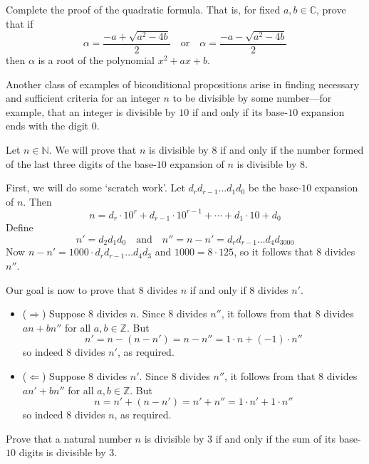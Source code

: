 \begin{exercise}
\label{exQuadraticFormulaConverse}
Complete the proof of the quadratic formula. That is, for fixed $a,b \in \mathbb{C}$, prove that if
\[
\alpha = \frac{-a+\sqrt{a^2-4b}}{2} \quad \text{or} \quad \alpha =\frac{-a-\sqrt{a^2-4b}}{2}
\]
then $\alpha$ is a root of the polynomial $x^2+ax+b$.
\end{exercise}

Another class of examples of biconditional propositions arise in finding necessary and sufficient criteria for an integer $n$ to be divisible by some number---for example, that an integer is divisible by $10$ if and only if its base-$10$ expansion ends with the digit $0$.

\begin{example}
\label{exTestForDivisibilityByEight}
Let $n \in \mathbb{N}$. We will prove that $n$ is divisible by $8$ if and only if the number formed of the last three digits of the base-$10$ expansion of $n$ is divisible by $8$.

First, we will do some `scratch work'. Let $d_rd_{r-1}\dots{}d_1d_0$ be the base-$10$ expansion of $n$. Then
\[
n = d_r \cdot 10^r + d_{r-1} \cdot 10^{r-1} + \cdots + d_1 \cdot 10 + d_0
\]
Define
\[
n' = d_2d_1d_0 \quad \text{and} \quad n'' = n-n' = d_rd_{r-1}\dots{}d_4d_3000
\]
Now $n-n' = 1000 \cdot d_rd_{r-1} \dots d_4d_3$ and $1000 = 8 \cdot 125$, so it follows that $8$ divides $n''$.

Our goal is now to prove that $8$ divides $n$ if and only if $8$ divides $n'$.

\begin{itemize}
\item ($\Rightarrow$) Suppose $8$ divides $n$. Since $8$ divides $n''$, it follows from  that $8$ divides $an+bn''$ for all $a,b \in \mathbb{Z}$. But
\[
n' = n-(n-n') = n-n'' = 1 \cdot n + (-1) \cdot n''
\]
so indeed $8$ divides $n'$, as required.
\item ($\Leftarrow$)  Suppose $8$ divides $n'$. Since $8$ divides $n''$, it follows from  that $8$ divides $an'+bn''$ for all $a,b \in \mathbb{Z}$. But
\[
n = n'+(n-n') = n'+n'' = 1 \cdot n' + 1 \cdot n''
\]
so indeed $8$ divides $n$, as required.
\end{itemize}
\end{example}

\begin{exercise}
Prove that a natural number $n$ is divisible by $3$ if and only if the sum of its base-$10$ digits is divisible by $3$.
\end{exercise}

